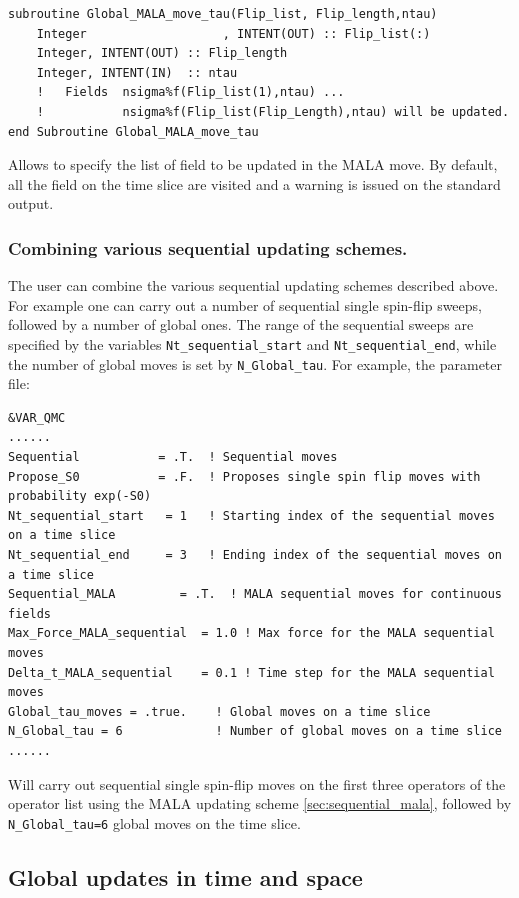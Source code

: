 \begin{lstlisting}[style=fortran]
subroutine Global_MALA_move_tau(Flip_list, Flip_length,ntau)
    Integer                   , INTENT(OUT) :: Flip_list(:)
    Integer, INTENT(OUT) :: Flip_length
    Integer, INTENT(IN)  :: ntau
	!   Fields  nsigma%f(Flip_list(1),ntau) ... 
	!           nsigma%f(Flip_list(Flip_Length),ntau) will be updated.
end Subroutine Global_MALA_move_tau
\end{lstlisting}
Allows to  specify the list of field to be updated in the MALA move. By default, all the  field on  the time slice are visited and 
a warning is issued on the standard output. 

\subsubsection{Combining various sequential updating schemes.}
\label{sec:sequential_combination}
The user can combine the various sequential updating schemes described above.  For  example one can carry out a number of sequential single spin-flip sweeps,  followed 
by a number of global ones.  The range of the sequential sweeps are specified by the variables \texttt{Nt\_sequential\_start} and \texttt{Nt\_sequential\_end}, while the number of global moves is set by \texttt{N\_Global\_tau}.
For  example, the parameter file: 
\begin{lstlisting}[style=fortran]
&VAR_QMC
......
Sequential           = .T.  ! Sequential moves
Propose_S0           = .F.  ! Proposes single spin flip moves with probability exp(-S0) 
Nt_sequential_start   = 1   ! Starting index of the sequential moves on a time slice
Nt_sequential_end     = 3   ! Ending index of the sequential moves on a time slice
Sequential_MALA         = .T.  ! MALA sequential moves for continuous fields
Max_Force_MALA_sequential  = 1.0 ! Max force for the MALA sequential moves
Delta_t_MALA_sequential    = 0.1 ! Time step for the MALA sequential moves
Global_tau_moves = .true.    ! Global moves on a time slice
N_Global_tau = 6             ! Number of global moves on a time slice
......
\end{lstlisting}
Will carry out sequential single spin-flip moves on the first three operators of the operator list using the MALA updating scheme \ref{sec:sequential_mala}, followed by \texttt{N\_Global\_tau=6} global moves on the time slice.


\subsection{Global updates in time and space}


